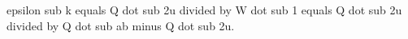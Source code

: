 epsilon sub k equals Q dot sub 2u divided by W dot sub 1 equals Q dot sub 2u divided by Q dot sub ab minus Q dot sub 2u.